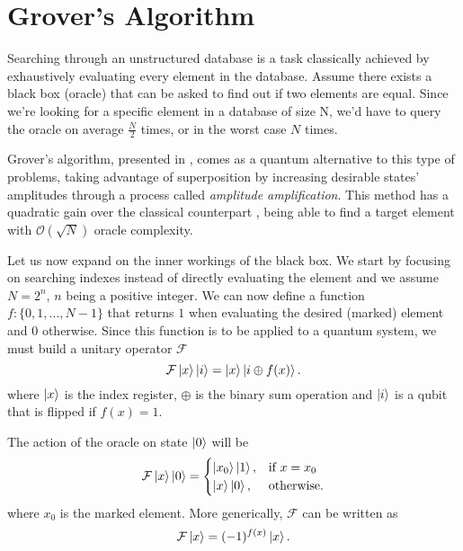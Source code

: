         \section{Grover's Algorithm}\label{chapGrover}
        Searching through an unstructured database is a task classically achieved by exhaustively evaluating every element in the database. Assume there exists a black box (oracle) that can be asked to find out if two elements are equal. Since we're looking for a specific element in a database of size N, we'd have to query the oracle on average $\frac{N}{2}$ times, or in the worst case $N$ times.\par
        Grover's algorithm, presented in \cite{grover1996}, comes as a quantum alternative to this type of problems, taking advantage of superposition by increasing desirable states' amplitudes through a process called \textit{amplitude amplification}. This method has a quadratic gain over the classical counterpart \cite{boyer1996}, being able to find a target element with $\mathcal{O}(\sqrt{N})$ oracle complexity.\par
        Let us now expand on the inner workings of the black box. We start by focusing on searching indexes     instead of directly evaluating the element and we assume $N=2^{n}$, $n$ being a positive integer. We can now define a function $f : \{0,1,...,N-1\}$ that returns $1$ when evaluating the desired (marked) element and $0$ otherwise. Since this function is to be applied to a quantum system, we must build a unitary operator $\mathcal{F}$
        \begin{equation}
                        \mathcal{F}\ket{x}\ket{i} = \ket{x}\ket{i\oplus f(x)} .
        \end{equation}
        where $\ket{x}$ is the index register, $\oplus$ is the binary sum operation and $\ket{i}$ is a qubit that is flipped if $f(x)=1$.\par 
        The action of the oracle on state $\ket{0}$ will be
        \begin{equation}
                \mathcal{F}\ket{x}\ket{0} = \begin{cases} \ket{x_0}\ket{1}, & \mbox{if } x = x_0 \\ \ket{x}\ket{0}, & \mbox{otherwise.} \end{cases}
        \end{equation}
        where $x_0$ is the marked element. More generically, $\mathcal{F}$ can be written as
        \begin{equation}
                        \mathcal{F}\ket{x} = (-1)^{f(x)}\ket{x} .
        \end{equation}\par
